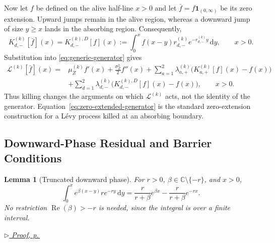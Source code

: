 \documentclass[11pt]{article}
\newcommand{\proofref}[1]{%
  \par\noindent\hfill{\small\itshape\hyperref[#1]{$\triangleright$ Proof, p.\,\pageref{#1}}}}
\newcommand{\diff}{\mathrm{d}}
\newcommand{\one}{\mathbf{1}}
\newcommand{\Rea}{\operatorname{Re}}
\theoremstyle{plain}
\newtheorem{lemma}[theorem]{Lemma}
\theoremstyle{definition}
\theoremstyle{remark}
\begin{document}
Now let $f$ be defined on the alive half-line $x>0$ and let
$\bar f=f\one_{(0,\infty)}$ be its zero extension. Upward jumps remain in the alive region,
whereas a downward jump of size $y\ge x$ lands in the absorbing region. Consequently,
\begin{equation}\label{eq:killed-downward-operator}
K_{d,-}^{(k)}[\bar f](x)
=K_{d,-}^{(k),D}[f](x)
:=\int_0^x f(x-y)r_{d,-}^{(k)}e^{-r_{d,-}^{(k)}y}\,\diff y,
\qquad x>0.
\end{equation}
Substitution into \eqref{eq:generic-generator} gives
\begin{equation}\label{eq:zero-extended-generator}
\begin{aligned}
\mathcal L^{(k)}[\bar f](x)
={}&\mu_Z^{(k)}f'(x)+\frac{\sigma_Z^2}{2}f''(x)
+\sum_{a=1}^2\lambda_{a,+}^{(k)}
  \bigl(K_{a,+}^{(k)}[f](x)-f(x)\bigr)\\
&+\sum_{d=1}^2\lambda_{d,-}^{(k)}
  \bigl(K_{d,-}^{(k),D}[f](x)-f(x)\bigr),
\qquad x>0.
\end{aligned}
\end{equation}
Thus killing changes the arguments on which $\mathcal L^{(k)}$ acts, not the identity of the
generator. Equation~\eqref{eq:zero-extended-generator} is the standard zero-extension
construction for a L\'evy process killed at an absorbing boundary.

\subsection{Downward-Phase Residual and Barrier Conditions}

\begin{lemma}[Truncated downward phase]\label{lem:truncated-phase}
For $r>0$, $\beta\in\mathbb C\setminus\{-r\}$, and $x>0$,
\begin{equation}\label{eq:truncated-phase}
\int_0^x e^{\beta(x-y)}r e^{-ry}\,\diff y
=\frac{r}{r+\beta}e^{\beta x}
-\frac{r}{r+\beta}e^{-rx}.
\end{equation}
No restriction $\Rea(\beta)>-r$ is needed, since the integral is over a finite interval.
\end{lemma}
\proofref{proof:lem:truncated-phase}
\end{document}
